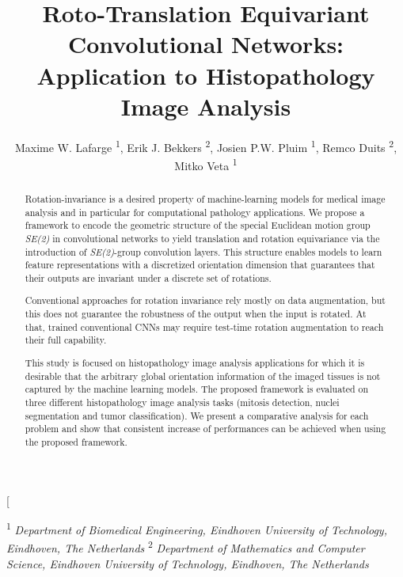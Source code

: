 \documentclass[twocolumn,final]{article}
\newcommand{\se}[1]{\textit{SE(#1)}}
\begin{document}
\twocolumn[
  \begin{@twocolumnfalse}

\title{
Roto-Translation Equivariant Convolutional Networks:\\
Application to Histopathology Image Analysis
}
\date{}

\vspace*{-50pt}
\begin{minipage}{\textwidth}
\centering
\author{
Maxime W. Lafarge\textsuperscript{ 1},
Erik J. Bekkers\textsuperscript{ 2},
Josien P.W. Pluim\textsuperscript{ 1},
Remco Duits\textsuperscript{ 2},
Mitko Veta\textsuperscript{ 1}
}
\end{minipage}

\maketitle

\vspace*{-20pt}\hspace*{40pt}\begin{minipage}{0.9\textwidth}
\footnotesize
\textsuperscript{1} \textit{Department of Biomedical Engineering, Eindhoven University of Technology, Eindhoven, The Netherlands} \newline
\textsuperscript{2} \textit{Department of Mathematics and Computer Science, Eindhoven University of Technology, Eindhoven, The Netherlands}
\end{minipage}


\vspace*{20pt}
\begin{abstract}
	Rotation-invariance is a desired property of machine-learning models for medical image analysis and in particular for computational pathology applications. 
	We propose a framework to encode the geometric structure of the special Euclidean motion group \se{2} in convolutional networks to yield translation and rotation equivariance via the introduction of \se{2}-group convolution layers. 
	This structure enables models to learn feature representations with a discretized orientation dimension that guarantees that their outputs are invariant under a discrete set of rotations.
	
	Conventional approaches for rotation invariance rely mostly on data augmentation, but this does not guarantee the robustness of the output when the input is rotated.
    At that, trained conventional CNNs may require test-time rotation augmentation to reach their full capability.
	
	This study is focused on histopathology image analysis applications for which it is desirable that the arbitrary global orientation information of the imaged tissues is not captured by the machine learning models.
	The proposed framework is evaluated on three different histopathology image analysis tasks (mitosis detection, nuclei segmentation and tumor classification).
	We present a comparative analysis for each problem and show that consistent increase of performances can be achieved when using the proposed framework.
\end{abstract}
\vspace*{20pt}

  \end{@twocolumnfalse}
\end{document}

